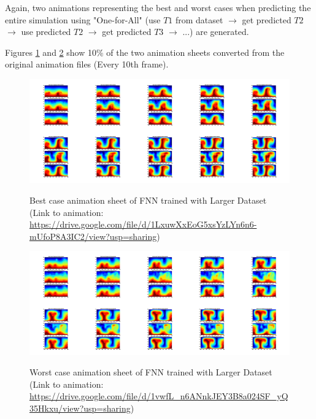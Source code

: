 Again, two animations representing the best and worst cases when predicting the entire simulation using "One-for-All" (use $T1$ from dataset $\rightarrow$ get predicted $T2$ $\rightarrow$ use predicted $T2$ $\rightarrow$ get predicted $T3$ $\rightarrow$ ...) are generated.

Figures \ref{figure:FNN_larger_best_gif} and \ref{figure:FNN_larger_worst_gif} show 10\% of the two animation sheets converted from the original animation files (Every 10th frame).

\begin{figure}[H]
    \centering
    \caption{Best case animation sheet of FNN trained with Larger Dataset (Link to animation: \url{https://drive.google.com/file/d/1LxuwXxEoG5xsYzLYn6n6-mUfoP8A3IC2/view?usp=sharing})}
    \includegraphics[scale=0.10]{figures/mantle_convection_images/larger_dataset/FNN_Best_GIF_sheet.png}
    \label{figure:FNN_larger_best_gif}
\end{figure}

\begin{figure}[H]
    \centering
    \caption{Worst case animation sheet of FNN trained with Larger Dataset (Link to animation: 
    \url{https://drive.google.com/file/d/1vwfL_n6ANnkJEY3B8a024SF_yQ35Hkxu/view?usp=sharing})}
    \includegraphics[scale=0.10]{figures/mantle_convection_images/larger_dataset/FNN_Worst_GIF_sheet.png}
    \label{figure:FNN_larger_worst_gif}
\end{figure}

